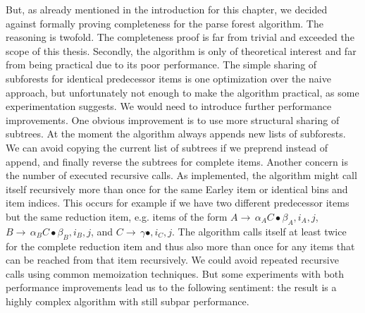 \begin{isabellebody}
\begin{isamarkuptext}
But, as already mentioned in the introduction for this chapter, we decided against formally proving completeness for the parse forest algorithm. The
reasoning is twofold. The completeness proof is far from trivial and exceeded the scope of this thesis.
Secondly, the algorithm is only of theoretical interest and far from being practical due to its poor performance.
The simple sharing of subforests for identical predecessor items is one optimization over the naive approach, but unfortunately
not enough to make the algorithm practical, as some experimentation suggests. We would need to introduce
further performance improvements. One obvious improvement is to use more structural sharing of subtrees.
At the moment the algorithm always appends new lists of subforests. We can avoid copying the current list
of subtrees if we preprend instead of append, and finally reverse the subtrees for complete items. 
Another concern is the number of executed recursive calls. As implemented, the algorithm might call itself recursively more than
once for the same Earley item or identical bins and item indices. This occurs for example if we have
two different predecessor items but the same reduction item, e.g. items of the form $A \rightarrow \, \alpha_A C \bullet \beta_A, i_A, j$,
$B \rightarrow \, \alpha_B C \bullet \beta_B, i_B, j$, and $C \rightarrow \, \gamma \bullet, i_C, j$. The algorithm calls itself at least twice for
the complete reduction item and thus also more than once for any items that can be reached from that item recursively. We could avoid repeated recursive calls using
common memoization techniques. But some experiments with both performance improvements lead us to the following sentiment: the result is a
highly complex algorithm with still subpar performance. 


\end{isamarkuptext}
\end{isabellebody}
